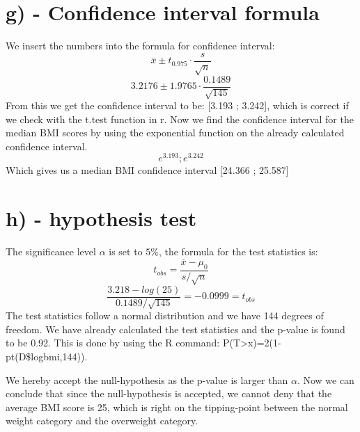 \documentclass{memoir}
\begin{document}
\section{g) - Confidence interval formula}
We insert the numbers into the formula for confidence interval: 
$$ \bar{x} \pm t_{0.975} \cdot \frac{s}{\sqrt{n}}$$
$$ 3.2176 \pm 1.9765 \cdot \frac{0.1489}{\sqrt{145}}$$
From this we get the confidence interval to be: [3.193 ; 3.242], which is correct if we check with the t.test function in r. 
Now we find the confidence interval for the median BMI scores by using the exponential function on the already calculated confidence interval. 
$$ e^{3.193} ; e^{3.242} $$
Which gives us a median BMI confidence interval [24.366 ; 25.587]

\section{h) - hypothesis test}
The significance level $\alpha$ is set to $5 \% $, the formula for the test statistics is:
$$ t_{obs} = \frac{\bar{x}-\mu_{0}}{s / \sqrt{n}} $$
$$ \frac{3.218-log(25)}{0.1489 / \sqrt{145}} = -0.0999 = t_{obs}$$
The test statistics follow a normal distribution and we have 144 degrees of freedom. 
We have already calculated the test statistics and the p-value is found to be 0.92. This is done by using the R command: P(T>x)=2(1-pt(D\$logbmi,144)). 

We hereby accept the null-hypothesis as the p-value is larger than $\alpha$.
Now we can conclude that since the null-hypothesis is accepted, we cannot deny that the average BMI score is 25, which is right on the tipping-point between the normal weight category and the overweight category. 
\end{document}
